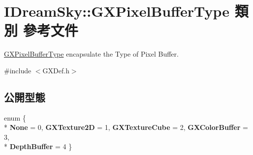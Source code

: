 \hypertarget{class_i_dream_sky_1_1_g_x_pixel_buffer_type}{}\section{I\+Dream\+Sky\+:\+:G\+X\+Pixel\+Buffer\+Type 類別 參考文件}
\label{class_i_dream_sky_1_1_g_x_pixel_buffer_type}


\hyperlink{class_i_dream_sky_1_1_g_x_pixel_buffer_type}{G\+X\+Pixel\+Buffer\+Type} encapsulate the Type of Pixel Buffer.  




{\ttfamily \#include $<$G\+X\+Def.\+h$>$}

\subsection*{公開型態}
\begin{DoxyCompactItemize}
\item 
enum \{ \\*
{\bfseries None} = 0, 
{\bfseries G\+X\+Texture2D} = 1, 
{\bfseries G\+X\+Texture\+Cube} = 2, 
{\bfseries G\+X\+Color\+Buffer} = 3, 
\\*
{\bfseries Depth\+Buffer} = 4
 \}\hypertarget{class_i_dream_sky_1_1_g_x_pixel_buffer_type_ac251628ded33b348ac1ec70998a5356b}{}\label{class_i_dream_sky_1_1_g_x_pixel_buffer_type_ac251628ded33b348ac1ec70998a5356b}

\end{DoxyCompactItemize}
